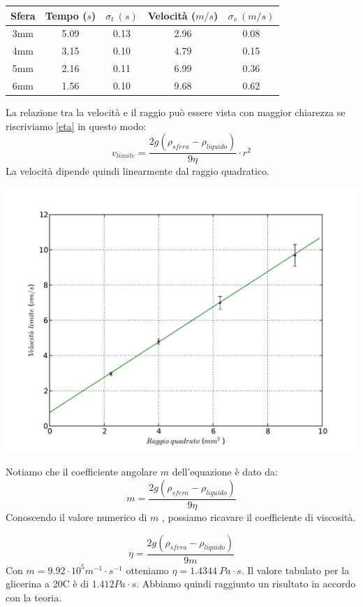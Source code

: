 \begin{center}
\begin{tabular}{c|c|c|c|c}
Sfera & Tempo ($s$) & $\sigma_t\ (s) $ & Velocità ($m/s$) & $\sigma_v \ (m/s) $\\
\midrule
3mm & 5.09 & 0.13 & 2.96 & 0.08\\
4mm & 3.15 & 0.10 & 4.79 & 0.15\\
5mm & 2.16 & 0.11 & 6.99 & 0.36\\
6mm & 1.56 & 0.10 & 9.68 & 0.62\\
\end{tabular}
\end{center}
La relazione tra la velocità e il raggio può essere vista con maggior chiarezza se riscriviamo \ref{eta}  in questo modo: 
\begin{equation}\label{vlim}
v_{limite}=  \frac{2g(\rho_{sfera} - \rho_{liquido})}{9 \eta} \cdot r^2
\end{equation}
La velocità dipende quindi linearmente dal raggio quadratico.
\begin{center}
\includegraphics[scale=0.75]{../grafici/velocita}
\end{center}
Notiamo che il coefficiente angolare $m$ dell'equazione \label{vlim} è dato da:
\begin{equation}
m= \frac{2g(\rho_{sfera} - \rho_{liquido})}{9 \eta}
\end{equation}
Conoscendo il valore numerico di $m$ , possiamo ricavare il coefficiente di viscosità.

\begin{equation}
\eta = \frac{2g(\rho_{sfera} - \rho_{liquido})}{9 m}
\end{equation}
Con $m = 9.92 \cdot 10^{5} m^{-1}\cdot s^{-1}$ otteniamo  $\eta = 1.4344 \ Pa \cdot s$.
Il valore tabulato per la glicerina a 20C  è di $1.412 Pa \cdot s$. Abbiamo quindi raggiunto un risultato in accordo con la teoria. 

